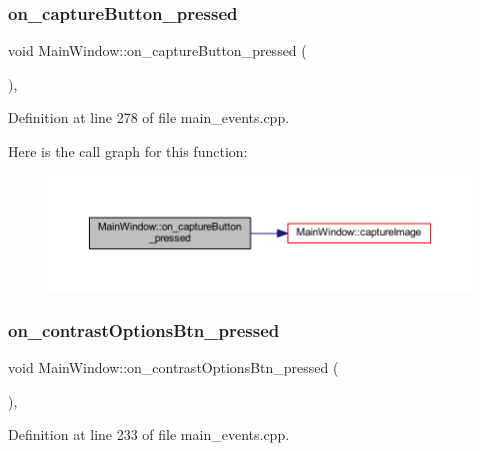 \subsubsection{\texorpdfstring{on\_captureButton\_pressed}{on\_captureButton\_pressed}}
{\footnotesize\ttfamily void Main\+Window\+::on\+\_\+capture\+Button\+\_\+pressed (\begin{DoxyParamCaption}{ }\end{DoxyParamCaption})\hspace{0.3cm}{\ttfamily [private]}, {\ttfamily [slot]}}



Definition at line 278 of file main\+\_\+events.\+cpp.

Here is the call graph for this function\+:
\nopagebreak
\begin{figure}[H]
\begin{center}
\leavevmode
\includegraphics[width=350pt]{class_main_window_a2a1fcefe2bf1f110eb2c589ac57b07d7_cgraph}
\end{center}
\end{figure}
\mbox{\label{class_main_window_a803bb81c63591b7f6c3306f712438378}} 
\subsubsection{\texorpdfstring{on\_contrastOptionsBtn\_pressed}{on\_contrastOptionsBtn\_pressed}}
{\footnotesize\ttfamily void Main\+Window\+::on\+\_\+contrast\+Options\+Btn\+\_\+pressed (\begin{DoxyParamCaption}{ }\end{DoxyParamCaption})\hspace{0.3cm}{\ttfamily [private]}, {\ttfamily [slot]}}



Definition at line 233 of file main\+\_\+events.\+cpp.

